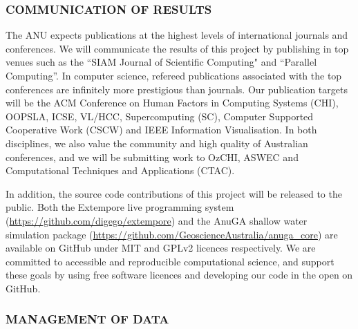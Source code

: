 \documentclass[a4paper,fontsize=12pt]{scrartcl}
\begin{document}
\subsubsection*{COMMUNICATION OF RESULTS}


The ANU expects publications at the highest levels of international journals and conferences.
We will communicate the results of this project by publishing in
top  venues such as the ``SIAM Journal of
Scientific Computing" and  “Parallel Computing”. In computer science, refereed publications associated with the top conferences are infinitely more prestigious  than journals. Our publication targets will be the ACM Conference on Human Factors in Computing Systems (CHI), OOPSLA, ICSE,  VL/HCC, Supercomputing (SC), Computer Supported Cooperative Work (CSCW) and IEEE Information Visualisation. In both disciplines, we also value the community and high quality of Australian conferences, and we will be submitting work to OzCHI, ASWEC and Computational Techniques and Applications (CTAC).


In addition, the source code contributions of this project will be
released to the public. Both the Extempore live programming system
(\url{https://github.com/digego/extempore}) and the AnuGA shallow
water simulation package
(\url{https://github.com/GeoscienceAustralia/anuga_core}) are
available on GitHub under MIT and GPLv2 licences respectively. We are
committed to accessible and reproducible computational science, and
support these goals by using free software licences and developing our
code in the open on GitHub.

\subsubsection*{MANAGEMENT OF DATA}
\end{document}
